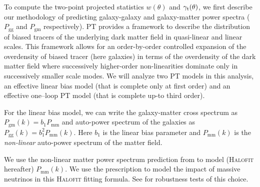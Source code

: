 \documentclass[aps, prd,twocolumn,superscriptaddress,nofootinbib,preprintnumbers]{revtex4-1}
\newcommand{\gammat}{\ensuremath{\gamma_{\rm t}(\theta)}}
\newcommand{\wtheta}{\ensuremath{w(\theta)}}
\newcommand{\pgg}{\ensuremath{P_{\mathrm{gg}}}}
\newcommand{\pgm}{\ensuremath{P_{\mathrm{gm}}}}
\newcommand{\red}[1]{\textcolor{red}{#1}}
\begin{document}
To compute the two-point projected statistics $\wtheta$ and $\gammat$, we first describe our methodology of predicting galaxy-galaxy and galaxy-matter power spectra ($\pgg$ and $\pgm$ respectively). PT provides a framework to describe the distribution of biased tracers of the underlying dark matter field in quasi-linear and linear scales. This framework allows for an order-by-order controlled expansion of the overdensity of biased tracer (here galaxies) in terms of the overdensity of the dark matter field where successively higher-order non-linearities dominate only in successively smaller scale modes. We will analyze two PT models in this analysis, an effective linear bias model (that is complete only at first order) and an effective one--loop PT model (that is complete up-to third order). 

For the linear bias model, we can write the galaxy-matter cross spectrum as $P_{\mathrm{gm}}(k) = b_1 P_{\mathrm{mm}}$ and auto-power spectrum of the galaxies as $P_{\mathrm{gg}}(k) = b_1^2 P_{\mathrm{mm}}(k)$. Here $b_1$ is the linear bias parameter and $P_{\mathrm{mm}}(k)$ is the \emph{non-linear} auto-power spectrum of the matter field. 

We use the non-linear matter power spectrum prediction from \citet{Takahashi:2012em} to model (\textsc{Halofit} hereafter) $P_{\mathrm{mm}}(k)$. We use the  \citet{Bird_halofit} prescription to model the impact of massive neutrinos in this \textsc{Halofit} fitting formula. See \cite{y3-generalmethods} for robustness tests of this choice.  

\end{document}
